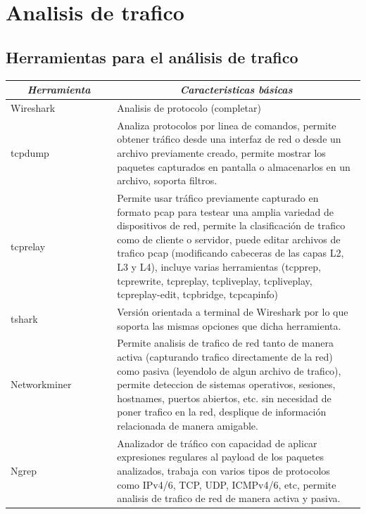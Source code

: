 \documentclass[12pt]{article}
\begin{document}
\section{Analisis de trafico} 

\subsection{Herramientas para el análisis de trafico}


\begin{table}[htbp]
\centering
\footnotesize
\begin{tabular}{|p{0.3\linewidth}|p{0.7\linewidth}|}
\hline
\multicolumn{1}{|c|}{\textit{\textbf{Herramienta}}} & \multicolumn{1}{c|}{\textit{\textbf{Caracteristicas básicas}}} \tabularnewline \hline

Wireshark & 
Analisis de protocolo (completar)  
\tabularnewline \hline

tcpdump & 
Analiza protocolos por linea de comandos, permite obtener tráfico desde una interfaz de red o desde un archivo previamente creado, permite mostrar los paquetes capturados en pantalla o almacenarlos en un archivo, soporta filtros.  
\tabularnewline \hline

tcprelay & 
Permite usar tráfico previamente capturado en formato pcap para testear una amplia variedad de dispositivos de red, permite la clasificación de trafico como de cliente o servidor, puede editar archivos de trafico pcap (modificando cabeceras de las capas L2, L3 y L4), incluye varias herramientas (tcpprep, tcprewrite, tcpreplay, tcpliveplay, tcpliveplay, tcpreplay-edit, tcpbridge, tcpcapinfo)
\tabularnewline \hline

tshark & 
Versión orientada a terminal de Wireshark por lo que soporta las mismas opciones que dicha herramienta. 
\tabularnewline \hline

Networkminer & 
Permite analisis de trafico de red tanto de manera activa (capturando trafico directamente de la red) como pasiva (leyendolo de algun archivo de trafico), permite deteccion de sistemas operativos, sesiones, hostnames, puertos abiertos, etc. sin necesidad de poner trafico en la red, desplique de información relacionada de manera amigable.
\tabularnewline \hline

Ngrep & 
Analizador de tráfico con capacidad de aplicar expresiones regulares al payload de los paquetes analizados, trabaja con varios tipos de protocolos como IPv4/6, TCP, UDP, ICMPv4/6, etc, permite analisis de trafico de red de manera activa y pasiva.
\tabularnewline \hline


\end{tabular}
\end{table}
\end{document}
